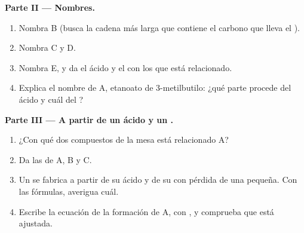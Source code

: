 \begin{problem}
\medskip
\noindent\textbf{Parte II --- Nombres.}
\begin{enumerate}[resume]
  \item Nombra B (busca la cadena más larga que contiene el carbono que
        lleva el ).
  \item Nombra C y D.
  \item Nombra E, y da el ácido y el  con los que está
        relacionado.
  \item Explica el nombre de A, etanoato de 3-metilbutilo: ¿qué parte
        procede del ácido y cuál del ?
\end{enumerate}

\medskip
\noindent\textbf{Parte III --- A partir de un ácido y un .}
\begin{enumerate}[resume]
  \item ¿Con qué dos compuestos de la mesa está relacionado A?
  \item Da las  de A, B y C.
  \item Un  se fabrica a partir de su ácido y de su  con
        pérdida de una  pequeña. Con las fórmulas, averigua
        cuál.
  \item Escribe la ecuación de la formación de A, con , y comprueba que está ajustada.
\end{enumerate}


\end{problem}
